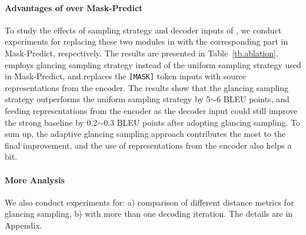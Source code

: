 \paragraph{Advantages of \method over Mask-Predict}
To study the effects of sampling strategy and decoder inputs of \method, we conduct experiments for replacing these two modules in \method with the corresponding part in Mask-Predict, respectively. 
The results are presented in Table~\ref{tb.ablation}. \method employs glancing sampling strategy instead of the uniform sampling strategy used in Mask-Predict, and replaces the \texttt{[MASK]} token inputs with source representations from the encoder. The results show that the glancing sampling strategy outperforms the uniform sampling strategy by 5$\sim$6 BLEU points, and feeding representations from the encoder as the decoder input could still improve the strong baseline by 0.2$\sim$0.3 BLEU points after adopting glancing sampling.
To sum up, the adaptive glancing sampling approach contributes the most to the final improvement, and the use of representations from the encoder also helps a bit.

\paragraph{More Analysis}
We also conduct experiments for: a) comparison of different distance metrics for glancing sampling, b) \method with more than one decoding iteration. The details are in Appendix.









%
